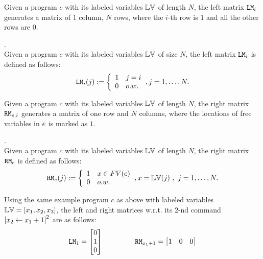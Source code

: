 Given a program  ${c}$ with its labeled variables $\mathbb{LV}$ of length $N$,
the left matrix $\mathtt{LM}_i$ generates a matrix of $1$ column, $N$ rows, 
where the $i$-th row is $1$ and all the other rows are $0$.
%
\begin{defn}.
\\
Given a program  ${c}$ with its labeled variables $\mathbb{LV}$ of size $N$, 
the left matrix $\mathtt{LM}_i$ is defined as follows:
\[
\lMtrix_i(j) : = 
\left
\{
\begin{array}{ll}
1 & j = i \\
0 & o.w.
\end{array}
\right.,
j = 1, \ldots, N.
\]
\end{defn}
%
Given a program  ${c}$ with its labeled variables $\mathbb{LV}$ of length $N$,
the right matrix $\mathtt{RM}_{e, i}$ generates a matrix of one row and $N$ columns, 
where the locations of free variables in $e$ is marked as $1$. 
%
%
\begin{defn}.
\\
Given a program  ${c}$ with its labeled variables $\mathbb{LV}$ of length $N$, 
the right matrix $\mathtt{RM}_{e}$ is defined as follows:
\[
\rMtrix_{\expr}(j) : = 
\left\{
\begin{array}{ll}
1 & {x} \in FV(\expr) 
\\
0 & o.w.
\end{array}
\right.,
{x} = \lvar(j) ~ , ~ j = 1, \ldots, N.
\]
%
%
\end{defn}
%
Using the same example program ${c}$ as above with labeled variables $\mathbb{LV} = [ {x_1 , x_2 , x_3} ] $,
the left and right matrices w.r.t. its $2$-nd command 
$\left[{\assign {x_2} {x_1 + 1}}\right]^2$  are as follows:
\[
\lMtrix_1 = \left[ \begin{matrix}
0   \\
1 	 \\
0   \\
\end{matrix}   \right ] 
~~~~~~~~~~~~~~
\rMtrix_{{x}_1 + 1}
= \left[ \begin{matrix} 
1 & 0 & 0 \\
\end{matrix}  \right]
\]
%
%
%
